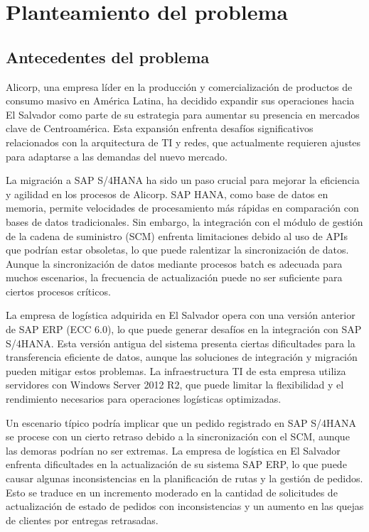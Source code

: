 \section{Planteamiento del problema}
\subsection{Antecedentes del problema}

Alicorp, una empresa líder en la producción y comercialización de productos de consumo masivo en América Latina, ha decidido expandir sus operaciones hacia El Salvador como parte de su estrategia para aumentar su presencia en mercados clave de Centroamérica. Esta expansión enfrenta desafíos significativos relacionados con la arquitectura de TI y redes, que actualmente requieren ajustes para adaptarse a las demandas del nuevo mercado.

La migración a SAP S/4HANA ha sido un paso crucial para mejorar la eficiencia y agilidad en los procesos de Alicorp. SAP HANA, como base de datos en memoria, permite velocidades de procesamiento más rápidas en comparación con bases de datos tradicionales. Sin embargo, la integración con el módulo de gestión de la cadena de suministro (SCM) enfrenta limitaciones debido al uso de APIs que podrían estar obsoletas, lo que puede ralentizar la sincronización de datos. Aunque la sincronización de datos mediante procesos batch es adecuada para muchos escenarios, la frecuencia de actualización puede no ser suficiente para ciertos procesos críticos.

La empresa de logística adquirida en El Salvador opera con una versión anterior de SAP ERP (ECC 6.0), lo que puede generar desafíos en la integración con SAP S/4HANA. Esta versión antigua del sistema presenta ciertas dificultades para la transferencia eficiente de datos, aunque las soluciones de integración y migración pueden mitigar estos problemas. La infraestructura TI de esta empresa utiliza servidores con Windows Server 2012 R2, que puede limitar la flexibilidad y el rendimiento necesarios para operaciones logísticas optimizadas.

Un escenario típico podría implicar que un pedido registrado en SAP S/4HANA se procese con un cierto retraso debido a la sincronización con el SCM, aunque las demoras podrían no ser extremas. La empresa de logística en El Salvador enfrenta dificultades en la actualización de su sistema SAP ERP, lo que puede causar algunas inconsistencias en la planificación de rutas y la gestión de pedidos. Esto se traduce en un incremento moderado en la cantidad de solicitudes de actualización de estado de pedidos con inconsistencias y un aumento en las quejas de clientes por entregas retrasadas.

